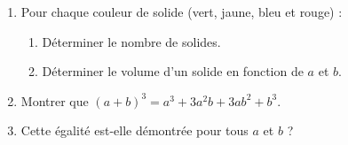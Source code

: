 \begin{exo}
	\begin{enumerate}
		\item Pour chaque couleur de solide (vert, jaune, bleu et rouge) :
		      \begin{enumerate}
			      \item Déterminer le nombre de solides.
			      \item Déterminer le volume d'un solide en fonction de $a$ et $b$.
		      \end{enumerate}
		\item Montrer que $(a + b)^3 = a^3 + 3a^2b + 3ab^2 + b^3$.
		\item Cette égalité est-elle démontrée pour tous $a$ et $b$ ?
	\end{enumerate}
\end{exo}
